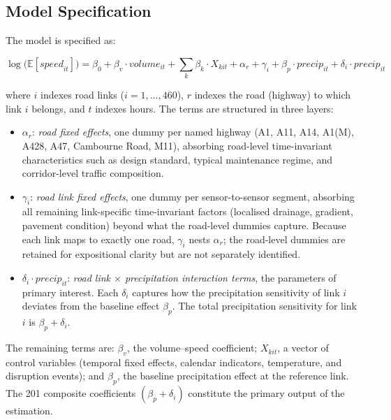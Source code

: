 \documentclass[review,authoryear]{elsarticle}
\begin{document}
\subsection{Model Specification}
\label{sec:method:spec}

The model is specified as:

\begin{equation}
\label{eq:glm}
\log\bigl(\mathbb{E}[\textit{speed}_{it}]\bigr) = \beta_0 + \beta_v \cdot \textit{volume}_{it} + \sum_k \beta_k \cdot X_{kit} + \alpha_r + \gamma_i + \beta_p \cdot \textit{precip}_{it} + \delta_i \cdot \textit{precip}_{it}
\end{equation}

\noindent where $i$ indexes road links ($i = 1, \ldots, 460$), $r$ indexes the road (highway) to which link $i$ belongs, and $t$ indexes hours. The terms are structured in three layers:

\begin{itemize}[nosep]
    \item $\alpha_r$: \textit{road fixed effects}, one dummy per named highway (A1, A11, A14, A1(M), A428, A47, Cambourne Road, M11), absorbing road-level time-invariant characteristics such as design standard, typical maintenance regime, and corridor-level traffic composition.
    \item $\gamma_i$: \textit{road link fixed effects}, one dummy per sensor-to-sensor segment, absorbing all remaining link-specific time-invariant factors (localised drainage, gradient, pavement condition) beyond what the road-level dummies capture. Because each link maps to exactly one road, $\gamma_i$ nests $\alpha_r$; the road-level dummies are retained for expositional clarity but are not separately identified.
    \item $\delta_i \cdot \textit{precip}_{it}$: \textit{road link $\times$ precipitation interaction terms}, the parameters of primary interest. Each $\delta_i$ captures how the precipitation sensitivity of link $i$ deviates from the baseline effect $\beta_p$. The total precipitation sensitivity for link $i$ is $\beta_p + \delta_i$.
\end{itemize}

\noindent The remaining terms are: $\beta_v$, the volume--speed coefficient; $X_{kit}$, a vector of control variables (temporal fixed effects, calendar indicators, temperature, and disruption events); and $\beta_p$, the baseline precipitation effect at the reference link. The 201 composite coefficients $(\beta_p + \delta_i)$ constitute the primary output of the estimation.
\end{document}
